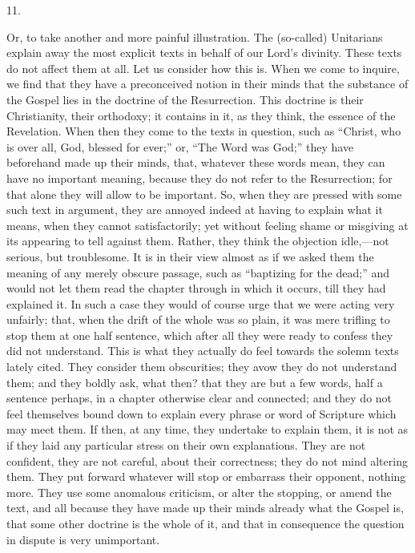 11.

Or, to take another and more painful illustration. The (so-called)
Unitarians explain away the most explicit texts in behalf of our Lord's
divinity. These texts do not affect them at all. Let us consider how
this is. When we come to inquire, we find that they have a
preconceived notion in their minds that the substance of the Gospel
lies in the doctrine of the Resurrection. This doctrine is their
Christianity, their orthodoxy; it contains in it, as they think, the
essence of the Revelation. When then they come to the texts in
question, such as ``Christ, who is over all, God, blessed for
ever;'' or, ``The Word was God;'' they have beforehand
made up their minds, that, whatever these words mean, they can have no
important meaning, because they do not refer to the Resurrection; for
that alone they will allow to be important. So, when they are pressed
with some such text in argument, they are annoyed indeed at having to
explain what it means, when they cannot satisfactorily; yet without
feeling shame or misgiving at its appearing to tell against them.
Rather, they think the objection idle,—not serious, but troublesome.
It is in their view almost as if we asked them the meaning of any
merely obscure passage, such as ``baptizing for the dead;''
and would not let them read the chapter through in which it occurs,
till they had explained it. In such a case they would of course urge
that we were acting very unfairly; that, when the drift of the whole
was so plain, it was mere trifling to stop them at one half sentence,
which after all they were ready to confess they did not understand.
This is what they actually do feel towards the solemn texts lately
cited. They consider them obscurities; they avow they do not
understand them; and they boldly ask, what then? that they are but a
few words, half a sentence perhaps, in a chapter otherwise clear and
connected; and they do not feel themselves bound down to explain
every phrase or word of Scripture which may meet them. If then, at any
time, they undertake to explain them, it is not as if they laid any
particular stress on their own explanations. They are not confident,
they are not careful, about their correctness; they do not mind
altering them. They put forward whatever will stop or embarrass their
opponent, nothing more. They use some anomalous criticism, or alter
the stopping, or amend the text, and all because they have made up
their minds already what the Gospel is, that some other doctrine is
the whole of it, and that in consequence the question in dispute is
very unimportant.

